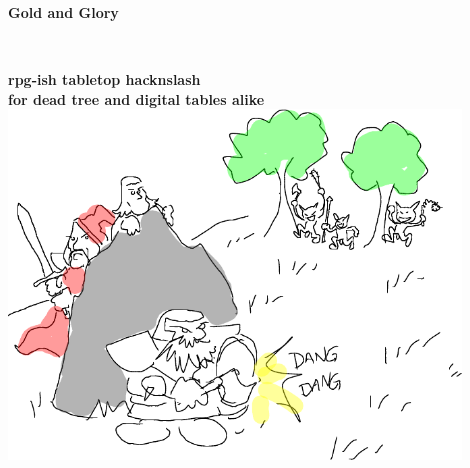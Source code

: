 \documentclass[11pt, twoside, titlepage, a4paper]{report}
\begin{document}



\setcounter{secnumdepth}{-1}









\begin{titlepage}
\thispagestyle{empty}

\begin{center}

   \vspace{4 cm} %

   \textbf{\Huge{Gold and Glory}}

   \ %

   \textbf{\Large{rpg-ish tabletop hacknslash\\
             for dead tree and digital tables alike}}\\


   \vspace{2 cm} %
   \includegraphics[width=120mm]{./figs/sneaky-plan.png}


\end{center}
\end{titlepage}
\end{document}
